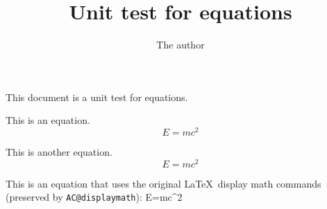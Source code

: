 \documentclass{article}
\title{Unit test for equations}
\author{The author}
\begin{document}
\maketitle

This document is a unit test for equations.

This is an equation.
\[
E=mc^2
\]

This is another equation.
\begin{equation}
E=mc^2
\end{equation}

This is an equation that  uses the original \LaTeX\ display math commands (preserved by \texttt{AC@displaymath}):
\makeatletter
\AC@displaymath
E=mc^2
\AC@enddisplaymath
\makeatother
\end{document}
